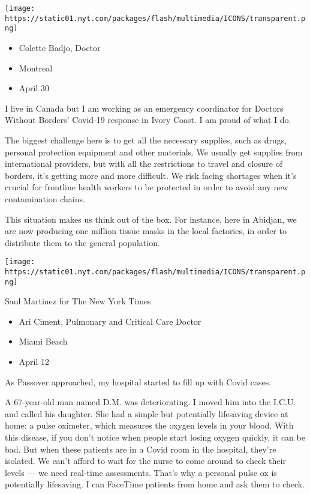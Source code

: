 \texttt{[image: https://static01.nyt.com/packages/flash/multimedia/ICONS/transparent.png]}

\begin{itemize}
\tightlist
\item
  Colette Badjo, Doctor
\item
  Montreal
\item
  April 30
\end{itemize}

I live in Canada but I am working as an emergency coordinator for
Doctors Without Borders' Covid-19 response in Ivory Coast. I am proud of
what I do.

The biggest challenge here is to get all the necessary supplies, such as
drugs, personal protection equipment and other materials. We usually get
supplies from international providers, but with all the restrictions to
travel and closure of borders, it's getting more and more difficult. We
risk facing shortages when it's crucial for frontline health workers to
be protected in order to avoid any new contamination chains.

This situation makes us think out of the box. For instance, here in
Abidjan, we are now producing one million tissue masks in the local
factories, in order to distribute them to the general population.

\texttt{[image: https://static01.nyt.com/packages/flash/multimedia/ICONS/transparent.png]}

Saul Martinez for The New York Times

\begin{itemize}
\tightlist
\item
  Ari Ciment, Pulmonary and Critical Care Doctor
\item
  Miami Beach
\item
  April 12
\end{itemize}

As Passover approached, my hospital started to fill up with Covid cases.

A 67-year-old man named D.M. was deteriorating. I moved him into the
I.C.U. and called his daughter. She had a simple but potentially
lifesaving device at home: a pulse oximeter, which measures the oxygen
levels in your blood. With this disease, if you don't notice when people
start losing oxygen quickly, it can be bad. But when these patients are
in a Covid room in the hospital, they're isolated. We can't afford to
wait for the nurse to come around to check their levels --- we need
real-time assessments. That's why a personal pulse ox is potentially
lifesaving. I can FaceTime patients from home and ask them to check.


